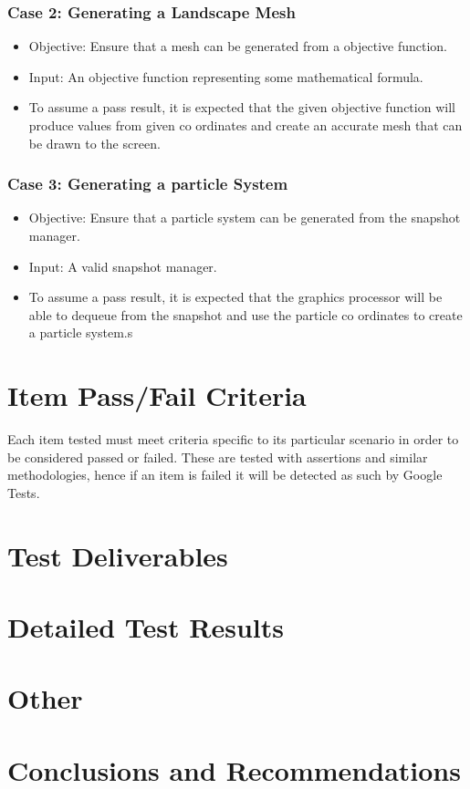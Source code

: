\documentclass[11pt]{article}
\begin{document}
\subsubsection{Case 2: Generating a Landscape Mesh}
\begin{itemize}
	\item Objective: Ensure that a mesh can be generated from a objective function.
	\item Input: An objective function representing some mathematical formula.
	\item To assume a pass result, it is expected that the given objective function will produce values from given co ordinates and create an accurate mesh that can be drawn to the screen.
\end{itemize}

\subsubsection{Case 3: Generating a particle System}
\begin{itemize}
	\item Objective: Ensure that a particle system can be generated from the snapshot manager.
	\item Input: A valid snapshot manager.
	\item To assume a pass result, it is expected that the graphics processor will be able to dequeue from the snapshot and use the particle co ordinates to create a particle system.s
\end{itemize}

\section{Item Pass/Fail Criteria}
Each item tested must meet criteria specific to its particular scenario in order to be considered passed or failed. These are tested with assertions and similar methodologies, hence if an item is failed it will be detected as such by Google Tests.

\section{Test Deliverables}

\section{Detailed Test Results}

\section{Other}

\section{Conclusions and Recommendations}
\end{document}
